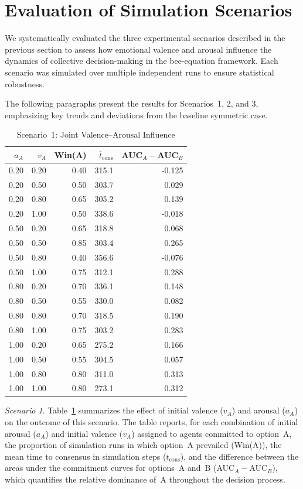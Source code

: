 \documentclass[a4paper,twoside]{article}
\begin{document}
\section{Evaluation of Simulation Scenarios}

We systematically evaluated the three experimental scenarios described in the previous section to assess how emotional valence and arousal influence the dynamics of collective decision-making in the bee-equation framework. Each scenario was simulated over multiple independent runs to ensure statistical robustness.  

The following paragraphs present the results for Scenarios~1, 2, and 3, emphasizing key trends and deviations from the baseline symmetric case.


\begin{table}[t]
\centering
\caption{Scenario~1: Joint Valence--Arousal Influence}
\label{tab:sc1}
\begin{tabular}{rrr r r}
\toprule
$a_A$ & $v_A$ & Win(A) & $\overline{t}_{\mathrm{cons}}$ & AUC$_A-$AUC$_B$\\
\midrule
0.20 & 0.20 & 0.40 & 315.1 & -0.125\\
0.20 & 0.50 & 0.50 & 303.7 &  0.029\\
0.20 & 0.80 & 0.65 & 305.2 &  0.139\\
0.20 & 1.00 & 0.50 & 338.6 & -0.018\\
0.50 & 0.20 & 0.65 & 318.8 &  0.068\\
0.50 & 0.50 & 0.85 & 303.4 &  0.265\\
0.50 & 0.80 & 0.40 & 356.6 & -0.076\\
0.50 & 1.00 & 0.75 & 312.1 &  0.288\\
0.80 & 0.20 & 0.70 & 336.1 &  0.148\\
0.80 & 0.50 & 0.55 & 330.0 &  0.082\\
0.80 & 0.80 & 0.70 & 318.5 &  0.190\\
0.80 & 1.00 & 0.75 & 303.2 &  0.283\\
1.00 & 0.20 & 0.65 & 275.2 &  0.166\\
1.00 & 0.50 & 0.55 & 304.5 &  0.057\\
1.00 & 0.80 & 0.80 & 311.0 &  0.313\\
1.00 & 1.00 & 0.80 & 273.1 &  0.312\\
\bottomrule
\end{tabular}
\end{table}

\noindent

\textit{Scenario 1}. Table~\ref{tab:sc1} summarizes the effect of initial valence ($v_A$) and arousal ($a_A$) on the outcome of this scenario. The table reports, for each combination of initial arousal ($a_A$) and initial valence ($v_A$) assigned to agents committed to option~A, the proportion of simulation runs in which option~A prevailed (Win(A)), the mean time to consensus in simulation steps ($\overline{t}_{\mathrm{cons}}$), and the difference between the areas under the commitment curves for options~A and~B (AUC$_A-$AUC$_B$), which quantifies the relative dominance of~A throughout the decision process.
\end{document}
